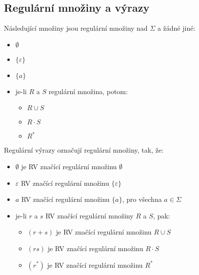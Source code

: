 \documentclass[a4paper, 12pt]{article}
\begin{document}
\subsection{Regulární množiny a výrazy}
Následující množiny jsou regulární množiny nad $\Sigma$ a žádné jiné:
\begin{itemize}
	\item $\emptyset$
	\item $\lbrace \varepsilon \rbrace$
	\item $\lbrace a \rbrace$
	\item je-li $R$ a $S$ regulární množina, potom:
	\begin{itemize}
		\item $R \cup S$
		\item $R \cdot S$
		\item $R^*$  
	\end{itemize}
\end{itemize}
Regulární výrazy označují regulární množiny, tak, že:
\begin{itemize}
	\item $\emptyset$ je RV značící regulární množinu $\emptyset$
	\item $\varepsilon$ RV značící regulární množinu $\lbrace \varepsilon \rbrace$
	\item $a$ RV značící regulární množinu $\lbrace a \rbrace$, pro všechna $a \in \Sigma$
	\item je-li $r$ a $s$ RV značící regulární množiny $R$ a $S$, pak:
	\begin{itemize}
		\item $(r+s)$ je RV značící regulární množinu $R \cup S$
		\item $(rs)$ je RV značící regulární množinu $R \cdot S$
		\item $(r^*)$ je RV značící regulární množinu $R^*$
	\end{itemize}
\end{itemize}
\end{document}

